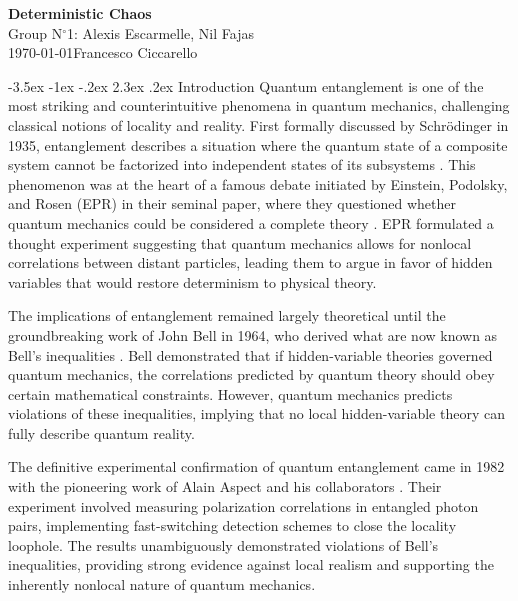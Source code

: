\documentclass[a4paper, 12pt,oneside]{article}
\makeatletter
\renewcommand{\section}{\@startsection {section}{1}{\z@}%
             {-3.5ex \@plus -1ex \@minus -.2ex}%
             {2.3ex \@plus.2ex}%
             {\normalfont\normalsize\bfseries}}
\makeatother
\begin{document}
\begin{center}
\large\textbf{\sffamily Deterministic Chaos}\\%
\large\sffamily Group N$^\circ$1: Alexis Escarmelle, Nil Fajas\\%
\large\sffamily \today\qquad Francesco Ciccarello\\%
\end{center}

\section{Introduction}
Quantum entanglement is one of the most striking and counterintuitive phenomena in quantum mechanics, challenging classical notions of locality and reality. First formally discussed by Schrödinger in 1935, entanglement describes a situation where the quantum state of a composite system cannot be factorized into independent states of its subsystems \cite{Schrodinger}. This phenomenon was at the heart of a famous debate initiated by Einstein, Podolsky, and Rosen (EPR) in their seminal paper, where they questioned whether quantum mechanics could be considered a complete theory \cite{EPR}. EPR formulated a thought experiment suggesting that quantum mechanics allows for nonlocal correlations between distant particles, leading them to argue in favor of hidden variables that would restore determinism to physical theory.

The implications of entanglement remained largely theoretical until the groundbreaking work of John Bell in 1964, who derived what are now known as Bell's inequalities \cite{Bell}. Bell demonstrated that if hidden-variable theories governed quantum mechanics, the correlations predicted by quantum theory should obey certain mathematical constraints. However, quantum mechanics predicts violations of these inequalities, implying that no local hidden-variable theory can fully describe quantum reality.

The definitive experimental confirmation of quantum entanglement came in 1982 with the pioneering work of Alain Aspect and his collaborators \cite{Alain Aspect}. Their experiment involved measuring polarization correlations in entangled photon pairs, implementing fast-switching detection schemes to close the locality loophole. The results unambiguously demonstrated violations of Bell’s inequalities, providing strong evidence against local realism and supporting the inherently nonlocal nature of quantum mechanics.
\end{document}
